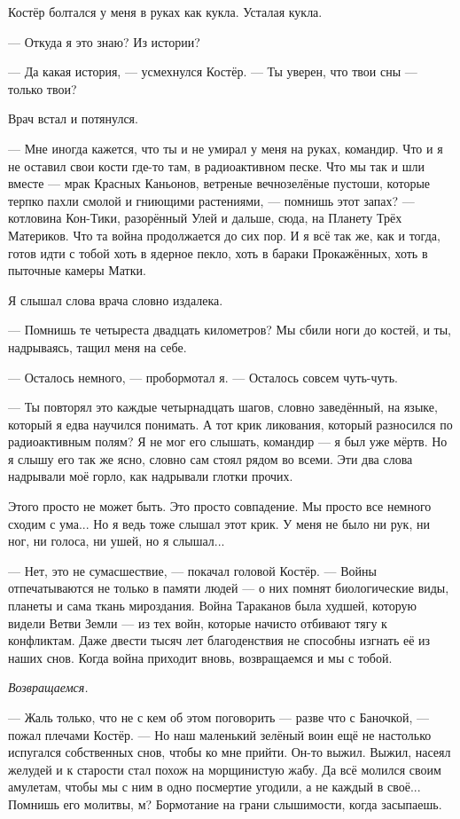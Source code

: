 Костёр болтался у меня в руках как кукла.
Усталая кукла.

--- Откуда я это знаю?
Из истории?

--- Да какая история, --- усмехнулся Костёр.
--- Ты уверен, что твои сны --- только твои?

Врач встал и потянулся.

--- Мне иногда кажется, что ты и не умирал у меня на руках, командир.
Что и я не оставил свои кости где-то там, в радиоактивном песке.
Что мы так и шли вместе --- мрак Красных Каньонов, ветреные вечнозелёные пустоши, которые терпко пахли смолой и гниющими растениями, --- помнишь этот запах? --- котловина Кон-Тики, разорённый Улей и дальше, сюда, на Планету Трёх Материков.
Что та война продолжается до сих пор.
И я всё так же, как и тогда, готов идти с тобой хоть в ядерное пекло, хоть в бараки Прокажённых, хоть в пыточные камеры Матки.

Я слышал слова врача словно издалека.

--- Помнишь те четыреста двадцать километров?
Мы сбили ноги до костей, и ты, надрываясь, тащил меня на себе.

--- Осталось немного, --- пробормотал я.
--- Осталось совсем чуть-чуть.

--- Ты повторял это каждые четырнадцать шагов, словно заведённый, на языке, который я едва научился понимать.
А тот крик ликования, который разносился по радиоактивным полям?
Я не мог его слышать, командир --- я был уже мёртв.
Но я слышу его так же ясно, словно сам стоял рядом во всеми.
Эти два слова надрывали моё горло, как надрывали глотки прочих.

Этого просто не может быть.
Это просто совпадение.
Мы просто все немного сходим с ума...
Но я ведь тоже слышал этот крик.
У меня не было ни рук, ни ног, ни голоса, ни ушей, но я слышал...

--- Нет, это не сумасшествие, --- покачал головой Костёр.
--- Войны отпечатываются не только в памяти людей --- о них помнят биологические виды, планеты и сама ткань мироздания.
Война Тараканов была худшей, которую видели Ветви Земли --- из тех войн, которые начисто отбивают тягу к конфликтам.
Даже двести тысяч лет благоденствия не способны изгнать её из наших снов.
Когда война приходит вновь, возвращаемся и мы с тобой.

\emph{Возвращаемся.}

--- Жаль только, что не с кем об этом поговорить --- разве что с Баночкой, --- пожал плечами Костёр.
--- Но наш маленький зелёный воин ещё не настолько испугался собственных снов, чтобы ко мне прийти.
Он-то выжил.
Выжил, насеял желудей и к старости стал похож на морщинистую жабу.
Да всё молился своим амулетам, чтобы мы с ним в одно посмертие угодили, а не каждый в своё...
Помнишь его молитвы, м?
Бормотание на грани слышимости, когда засыпаешь.

